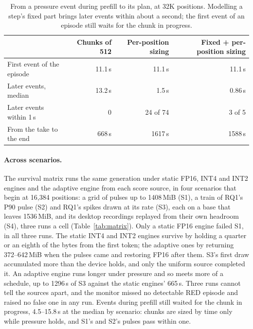 \documentclass{article}
\begin{document}
\begin{table}[t]
\caption{From a pressure event during prefill to its plan, at 32K positions.
Modelling a step's fixed part brings later events within about a second; the
first event of an episode still waits for the chunk in progress.}
\label{tab:prefill}
\centering
\small
\begin{tabular}{lrrr}
\toprule
& Chunks of 512 & Per-position sizing & Fixed + per-position sizing \\
\midrule
First event of the episode & 11.1\,s & 11.1\,s & 11.1\,s \\
Later events, median & 13.2\,s & 1.5\,s & 0.86\,s \\
Later events within 1\,s & 0 & 24 of 74 & 3 of 5 \\
From the take to the end & 668\,s & 1617\,s & 1588\,s \\
\bottomrule
\end{tabular}
\end{table}

\paragraph{Across scenarios.} The survival matrix runs the same generation under
static FP16, INT4 and INT2 engines and the adaptive engine from each score
source, in four scenarios that begin at 16{,}384 positions: a grid of pulses up
to 1408\,MiB (S1), a train of RQ1's P90 pulse (S2) and RQ1's spikes drawn at
its rate (S3), each on a base that leaves 1536\,MiB, and its desktop
recordings replayed from their own headroom (S4), three runs a cell (Table~\ref{tab:matrix}). Only a static FP16 engine
failed S1, in all three runs. The static INT4 and INT2 engines survive by
holding a quarter or an eighth of the bytes from the first token; the adaptive
ones by returning 372--642\,MiB when the pulses came and restoring FP16 after
them. S3's first draw accumulated more than the device holds, and only the
uniform source completed it. An adaptive engine runs longer under pressure and
so meets more of a schedule, up to 1296\,s of S3 against the static engines'
665\,s. Three runs cannot tell the sources apart, and the monitor missed no
detectable RED episode and raised no false one in any run. Events during prefill
still waited for the chunk in progress, 4.5--15.8\,s at the median by
scenario: chunks are sized by time only while pressure holds, and S1's and S2's
pulses pass within one.
\end{document}
